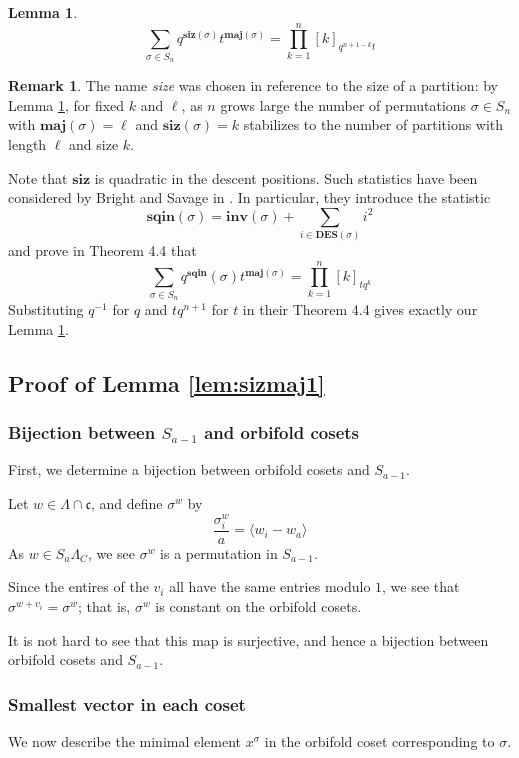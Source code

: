 \documentclass{amsart}[12pt]
\theoremstyle{definition}
\newtheorem{lemma}[dummy]{Lemma}
\newtheorem{remark}[dummy]{Remark}
\newcommand{\inv}{\mathbf{inv}}
\newcommand{\DES}{\mathbf{DES}}
\newcommand{\maj}{\mathbf{maj}}
\newcommand{\siz}{\mathbf{siz}}
\newcommand{\sqin}{\mathbf{sqin}}
\newcommand{\cone}{\mathfrak{c}}
\begin{document}
\begin{lemma} \label{lem:sizmaj2}
$$\sum_{\sigma\in S_n} q^{\siz(\sigma)} t^{\maj(\sigma)}=\prod_{k=1}^n [k]_{q^{n+1-k}t}$$
\end{lemma}


\begin{remark}
The name \emph{size} was chosen in reference to the size of a partition: by Lemma \ref{lem:sizmaj2}, for fixed $k$ and $\ell$, as $n$ grows large the number of permutations $\sigma\in S_n$ with $\maj(\sigma)=\ell$ and $\siz(\sigma)=k$ stabilizes to the number of partitions with length $\ell$ and size $k$.
\end{remark}

Note that $\siz$ is quadratic in the descent positions.  Such statistics have been considered by Bright and Savage in \cite{BS}.  In particular, they introduce the statistic 
$$\sqin(\sigma)=\inv(\sigma)+\sum_{i\in\DES(\sigma)} i^2$$
and prove in Theorem 4.4 that
$$\sum_{\sigma\in S_n} q^\sqin(\sigma)t^{\maj(\sigma)}=\prod_{k=1}^n [k]_{tq^k}$$
Substituting $q^{-1}$ for $q$ and $tq^{n+1}$ for $t$ in their Theorem 4.4 gives exactly our Lemma \ref{lem:sizmaj2}.


\subsection{Proof of Lemma \ref{lem:sizmaj1}}
\subsubsection{Bijection between $S_{a-1}$ and orbifold cosets}
First, we determine a bijection between orbifold cosets and $S_{a-1}$.  


Let $w\in\Lambda\cap \cone$, and define $\sigma^w$ by 
$$\frac{\sigma^w_i}{a}=\langle w_{i}-w_a\rangle$$
As $w\in S_a\Lambda_C$, we see $\sigma^w$ is a permutation in $S_{a-1}$.

Since the entires of the $v_i$ all have the same entries modulo $1$, we see that $\sigma^{w+v_i}=\sigma^w$; that is, $\sigma^w$ is constant on the orbifold cosets.  

It is not hard to see that this map is surjective, and hence a bijection between orbifold cosets and $S_{a-1}$.

\subsubsection{Smallest vector in each coset}
We now describe the minimal element $x^\sigma$ in the orbifold coset corresponding to $\sigma$.  
\end{document}
